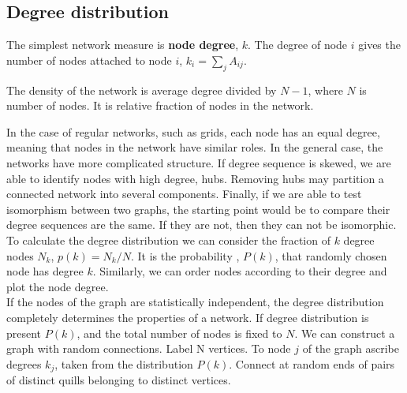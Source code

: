 
\subsection{Degree distribution}

The simplest network measure is \textbf{node degree}, $k$. The degree of node $i$ gives the number of nodes attached to node $i$, $k_i = \sum_j A_{ij}$. 

The density of the network is average degree divided by $N-1$, where $N$ is number of nodes. It is relative fraction of nodes in the network. 

In the case of regular networks, such as grids, each node has an equal degree, meaning that nodes in the network have similar roles. In the general case, the networks have more complicated structure. If degree sequence is skewed, we are able to identify nodes with high degree, hubs. Removing hubs may partition a connected network into several components. Finally, if we are able to test isomorphism between two graphs, the starting point would be to compare their degree sequences are the same. If they are not, then they can not be isomorphic. \\

To calculate the degree distribution we can consider the fraction of $k$ degree nodes $N_k$, $p(k) = N_k/N$. It is the probability , $P(k)$, that randomly chosen node has degree $k$. Similarly, we can order nodes according to their degree and plot the node degree. \\

If the nodes of the graph are statistically independent, the degree distribution completely determines the properties of a network. If degree distribution is present $P(k)$, and the total number of nodes is fixed to $N$. We can construct a graph with random connections. Label N vertices. To node $j$ of the graph ascribe degrees $k_j$, taken from the distribution $P(k)$. Connect at random ends of pairs of distinct quills belonging to distinct vertices. 


